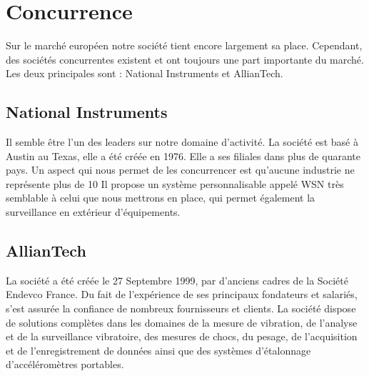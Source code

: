 \section{Concurrence}

Sur le marché européen notre société tient encore largement sa place. Cependant, des sociétés concurrentes existent et ont toujours une part importante du marché. Les deux principales sont : National Instruments et AllianTech.

        \subsection{National Instruments}
        Il semble être l'un des leaders sur notre domaine d'activité. La société est basé à Austin au Texas, elle a été créée en 1976. Elle a ses filiales dans plus de quarante pays. Un aspect qui nous permet de les concurrencer est qu'aucune industrie ne représente plus de 10%
        Il propose un système personnalisable appelé WSN très semblable à celui que nous mettrons en place, qui permet également la surveillance en extérieur d'équipements.

        \subsection{AllianTech}
        La société a été créée le 27 Septembre 1999, par d’anciens cadres de la Société Endevco France. Du fait de l’expérience de ses principaux fondateurs et salariés, s’est assurée la confiance de nombreux fournisseurs et clients. La société dispose de solutions complètes dans les domaines de la mesure de vibration, de l’analyse et de la surveillance vibratoire, des mesures de chocs, du pesage, de l’acquisition et de l’enregistrement de données ainsi que des systèmes d’étalonnage d’accéléromètres portables. 

